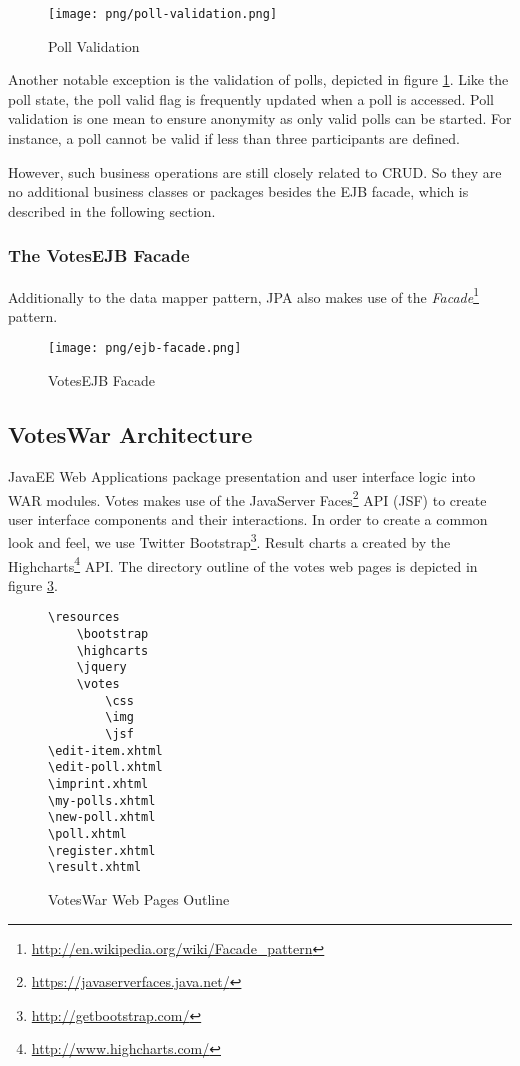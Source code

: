 \begin{figure}[h]
\centering
\texttt{[image: png/poll-validation.png]}
\caption{Poll Validation}
\label{figure:poll-validation}
\end{figure}

Another notable exception is the validation of polls, depicted in figure \ref{figure:poll-validation}.
Like the poll state, the poll valid flag is frequently updated when a poll is accessed.
Poll validation is one mean to ensure anonymity as only valid polls can be started.
For instance, a poll cannot be valid if less than three participants are defined.

However, such business operations are still closely related to CRUD.
So they are no additional business classes or packages besides the EJB facade, which is described in the following section.

\subsubsection{The VotesEJB Facade}
\label{subsubsec:the-votesejb-facade}
Additionally to the data mapper pattern, JPA also makes use of the \textit{Facade}\footnote{\url{http://en.wikipedia.org/wiki/Facade_pattern}} pattern.

\begin{figure}[h]
\centering
\texttt{[image: png/ejb-facade.png]}
\caption{VotesEJB Facade}
\label{figure:ejb-facade}
\end{figure}




\subsection{VotesWar Architecture}
JavaEE Web Applications package presentation and user interface logic into WAR modules.
Votes makes use of the JavaServer Faces\footnote{\url{https://javaserverfaces.java.net/}} API (JSF) to create user interface components and their interactions.
In order to create a common look and feel, we use Twitter Bootstrap\footnote{\url{http://getbootstrap.com/}}.
Result charts a created by the Highcharts\footnote{\url{http://www.highcharts.com/}} API.
The directory outline of the votes web pages is depicted in figure \ref{figure:web-directory-outline}.

\begin{figure}[h]
\centering
\begin{minipage}[t]{3cm}
\begin{verbatim}
\resources
    \bootstrap
    \highcarts
    \jquery
    \votes
        \css
        \img
        \jsf
\edit-item.xhtml
\edit-poll.xhtml
\imprint.xhtml
\my-polls.xhtml
\new-poll.xhtml
\poll.xhtml
\register.xhtml
\result.xhtml
\end{verbatim}
\end{minipage}

\caption{VotesWar Web Pages Outline}
\label{figure:web-directory-outline}
\end{figure}



